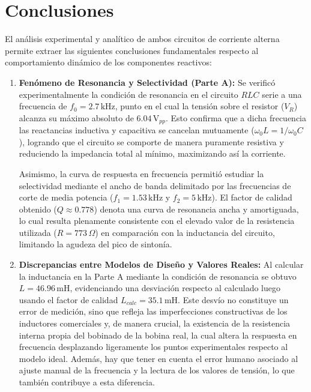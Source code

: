 \section{Conclusiones}
El análisis experimental y analítico de ambos circuitos de corriente alterna permite extraer las siguientes conclusiones fundamentales respecto al comportamiento dinámico de los componentes reactivos:

\begin{enumerate}
    \item \textbf{Fenómeno de Resonancia y Selectividad (Parte A):} Se verificó experimentalmente la condición de resonancia en el circuito $RLC$ serie a una frecuencia de $f_0 = 2.7\,\text{kHz}$, punto en el cual la tensión sobre el resistor ($V_R$) alcanza su máximo absoluto de $6.04\,\text{V}_{pp}$. Esto confirma que a dicha frecuencia las reactancias inductiva y capacitiva se cancelan mutuamente ($\omega_0 L = 1/\omega_0 C$), logrando que el circuito se comporte de manera puramente resistiva y reduciendo la impedancia total al mínimo, maximizando así la corriente. 
    
    Asimismo, la curva de respuesta en frecuencia permitió estudiar la selectividad mediante el ancho de banda delimitado por las frecuencias de corte de media potencia ($f_1 = 1.53\,\text{kHz}$ y $f_2 = 5\,\text{kHz}$). El factor de calidad obtenido ($Q \approx 0.778$) denota una curva de resonancia ancha y amortiguada, lo cual resulta plenamente consistente con el elevado valor de la resistencia utilizada ($R = 773\,\Omega$) en comparación con la inductancia del circuito, limitando la agudeza del pico de sintonía.

    \item \textbf{Discrepancias entre Modelos de Diseño y Valores Reales:} Al calcular la inductancia en la Parte A mediante la condición de resonancia se obtuvo $L = 46.96\,\text{mH}$, evidenciando una desviación respecto al calculado luego usando el factor de calidad $L_{calc} = 35.1\,\text{mH}$. Este desvío no constituye un error de medición, sino que refleja las imperfecciones constructivas de los inductores comerciales y, de manera crucial, la existencia de la resistencia interna propia del bobinado de la bobina real, la cual altera la respuesta en frecuencia desplazando ligeramente los puntos experimentales respecto al modelo ideal. Además, hay que tener en cuenta el error humano asociado al ajuste manual de la frecuencia y la lectura de los valores de tensión, lo que también contribuye a esta diferencia.


\end{enumerate}
